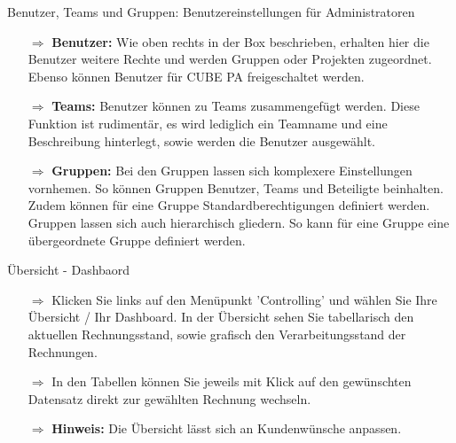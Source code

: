 \documentclass{article}
\begin{document}
\vspace{\baselineskip}

\begin{beamerlikethm}{Benutzer{,} Teams und Gruppen: Benutzereinstellungen für Administratoren}
\begin{itemize}
  \item[$\Longrightarrow$] \textbf{Benutzer:} Wie oben rechts in der Box beschrieben, erhalten hier die Benutzer weitere Rechte und werden Gruppen oder Projekten zugeordnet. Ebenso können Benutzer für CUBE PA freigeschaltet werden.
 \item[$\Longrightarrow$] \textbf{Teams:} Benutzer können zu Teams zusammengefügt werden. Diese Funktion ist rudimentär, es wird lediglich ein Teamname und eine Beschreibung hinterlegt, sowie werden die Benutzer ausgewählt. 
 \item[$\Longrightarrow$] \textbf{Gruppen:} Bei den Gruppen lassen sich komplexere Einstellungen vornhemen. So können Gruppen Benutzer, Teams und Beteiligte beinhalten. Zudem können für eine Gruppe Standardberechtigungen definiert werden. Gruppen lassen sich auch hierarchisch gliedern. So kann für eine Gruppe eine übergeordnete Gruppe definiert werden.
\end{itemize}
\end{beamerlikethm}




\pagebreak
{}

\vspace{\baselineskip}

\begin{beamerlikethm}{Übersicht - Dashbaord}
\begin{itemize}
  \item[$\Longrightarrow$] Klicken Sie links auf den Menüpunkt 'Controlling' und wählen Sie Ihre Übersicht / Ihr Dashboard. In der Übersicht sehen Sie tabellarisch den aktuellen Rechnungsstand, sowie grafisch den Verarbeitungsstand der Rechnungen.
 \item[$\Longrightarrow$] In den Tabellen können Sie jeweils mit Klick auf den gewünschten Datensatz direkt zur gewählten Rechnung wechseln.
 \item[$\Longrightarrow$] \textbf{Hinweis:} Die Übersicht lässt sich an Kundenwünsche anpassen.
\end{itemize}
\end{beamerlikethm}
\end{document}
